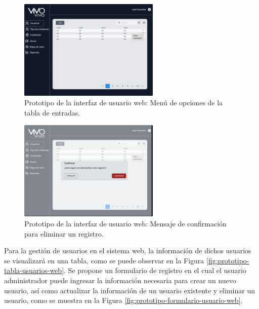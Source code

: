 \begin{figure}[H]
    \centering
    \includegraphics[width=0.6\textwidth]{chapters/III-resultados-y-discusion/resources/images/prototipo-menu-tabla-entradas-web.png}
    \caption{Prototipo de la interfaz de usuario web: Menú de opciones de la tabla de entradas.}
    \label{fig:prototipo-menu-tabla-entradas-web}
\end{figure}

\begin{figure}[H]
    \centering
    \includegraphics[width=0.6\textwidth]{chapters/III-resultados-y-discusion/resources/images/prototipo-mensaje-eliminar-web.png}
    \caption{Prototipo de la interfaz de usuario web: Mensaje de confirmación para eliminar un registro.}
    \label{fig:prototipo-mensaje-eliminar-web}
\end{figure}

Para la gestión de usuarios en el sistema web, la información de dichos usuarios se visualizará en una tabla, como se puede observar en la Figura
\ref{fig:prototipo-tabla-usuarios-web}. Se propone un formulario de registro en el cual el usuario administrador puede ingresar la información
necesaria para crear un nuevo usuario, así como actualizar la información de un usuario existente y eliminar un usuario, como se muestra en la Figura
\ref{fig:prototipo-formulario-usuario-web}.

